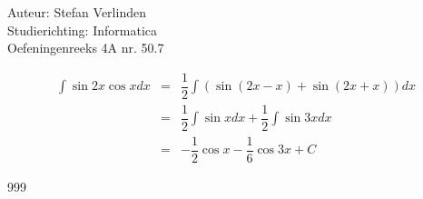 \documentclass[a4paper]{article}
\begin{document}
  
\noindent \large Auteur: Stefan Verlinden \\
\noindent \large Studierichting: Informatica\\
\noindent \large Oefeningenreeks 4A nr. 50.7\\

\medskip

\normalsize

\begin{eqnarray*}
\displaystyle\int\sin 2x\cos xdx	&=&	\dfrac{1}{2}\displaystyle\int(\sin(2x-x)+\sin(2x+x))dx\\
								&=&	\dfrac{1}{2}\displaystyle\int\sin xdx+\dfrac{1}{2}\displaystyle\int\sin 3xdx\\
								&=&	-\dfrac{1}{2}\cos x-\dfrac{1}{6}\cos 3x + C
\end{eqnarray*}

\begin{thebibliography}{999}
\end{thebibliography}
\end{document}
